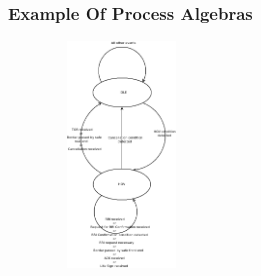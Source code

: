 \documentclass{beamer}
\begin{document}
\begin{frame}
\frametitle{Example Of Process Algebras } %
\begin{center}
\includegraphics[width=6cm, height=6cm]{RBCTypeProcess}
\end{center}

\end{frame}
\end{document}
